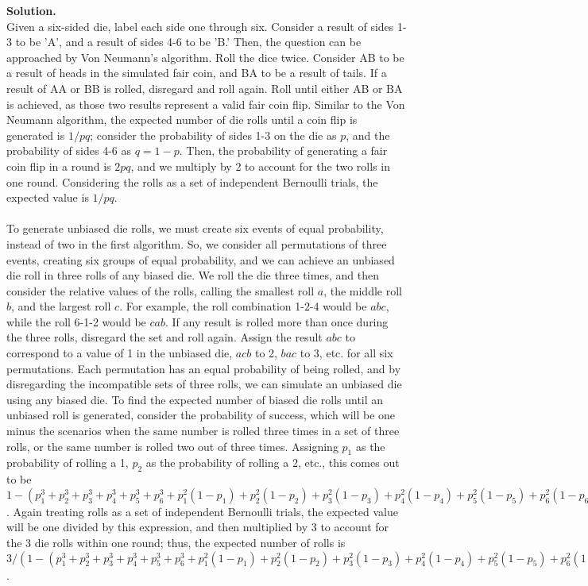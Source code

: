\documentclass[11pt]{article}
\newcommand\solution{%
  \textbf{Solution.}\\%
}
\begin{document}
\begin{enumerate}
\solution
Given a six-sided die, label each side one through six. Consider a result of sides 1-3 to be 'A', and a result of sides 4-6 to be 'B.' Then, the question can be approached by Von Neumann's algorithm. Roll the dice twice. Consider AB to be a result of heads in the simulated fair coin, and BA to be a result of tails. If a result of AA or BB is rolled, disregard and roll again. Roll until either AB or BA is achieved, as those two results represent a valid fair coin flip. Similar to the Von Neumann algorithm, the expected number of die rolls until a coin flip is generated is $1/pq$; consider the probability of sides 1-3 on the die as $p$, and the probability of sides 4-6 as $q = 1 - p$. Then, the probability of generating a fair coin flip in a round is $2pq$, and we multiply by 2 to account for the two rolls in one round. Considering the rolls as a set of independent Bernoulli trials, the expected value is $1/pq$. 
\\\\
To generate unbiased die rolls, we must create six events of equal probability, instead of two in the first algorithm. So, we consider all permutations of three events, creating six groups of equal probability, and we can achieve an unbiased die roll in three rolls of any biased die. We roll the die three times, and then consider the relative values of the rolls, calling the smallest roll $a$, the middle roll $b$, and the largest roll $c$. For example, the roll combination 1-2-4 would be $abc$, while the roll 6-1-2 would be $cab$. If any result is rolled more than once during the three rolls, disregard the set and roll again. Assign the result $abc$ to correspond to a value of 1 in the unbiased die, $acb$ to 2, $bac$ to 3, etc. for all six permutations. Each permutation has an equal probability of being rolled, and by disregarding the incompatible sets of three rolls, we can simulate an unbiased die using any biased die. To find the expected number of biased die rolls until an unbiased roll is generated, consider the probability of success, which will be one minus the scenarios when the same number is rolled three times in a set of three rolls, or the same number is rolled two out of three times. Assigning $p_1$ as the probability of rolling a 1, $p_2$ as the probability of rolling a 2, etc., this comes out to be $1 - (p_1^3 + p_2^3 + p_3^3 + p_4^3 + p_5^3 + p_6^3 + p_1^2(1-p_1) + p_2^2(1-p_2) + p_3^2(1-p_3) + p_4^2(1-p_4) + p_5^2(1-p_5) + p_6^2(1-p_6))$. Again treating rolls as a set of independent Bernoulli trials, the expected value will be one divided by this expression, and then multiplied by 3 to account for the 3 die rolls within one round; thus, the expected number of rolls is $3/ (1 - (p_1^3 + p_2^3 + p_3^3 + p_4^3 + p_5^3 + p_6^3 + p_1^2(1-p_1) + p_2^2(1-p_2) + p_3^2(1-p_3) + p_4^2(1-p_4) + p_5^2(1-p_5) + p_6^2(1-p_6)))$.


\end{enumerate}
\end{document}
